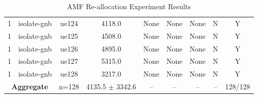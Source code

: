 \begin{table}[ht]
\begin{tabular}{|c|c|c|c|c|c|c|c|c|}
1 & isolate-gnb & ue124 & 4118.0 & None & None & None & N & Y \\
1 & isolate-gnb & ue125 & 4508.0 & None & None & None & N & Y \\
1 & isolate-gnb & ue126 & 4895.0 & None & None & None & N & Y \\
1 & isolate-gnb & ue127 & 5315.0 & None & None & None & N & Y \\
1 & isolate-gnb & ue128 & 3217.0 & None & None & None & N & Y \\
\multicolumn{2}{|c|}{\textbf{Aggregate}} & n=128 & 4135.5 $\pm$ 3342.6 & -- & -- & -- & -- & 128/128 \\
\hline
\end{tabular}
\caption{AMF Re-allocation Experiment Results}
\label{tab:amf_realloc}
\end{table}
